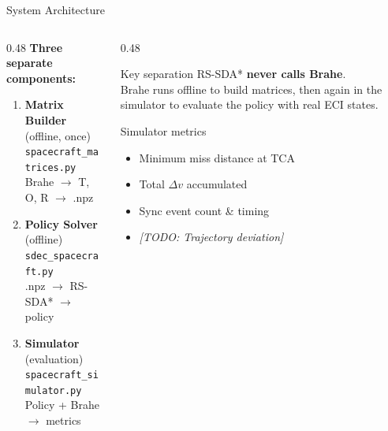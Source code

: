 \documentclass[aspectratio=169]{beamer}
\newcommand{\TODO}[1]{\textcolor{todo}{\textit{[TODO: #1]}}}
\begin{document}
\begin{frame}{System Architecture}
  \begin{columns}
    \begin{column}{0.48\textwidth}
      \textbf{Three separate components:}
      \vspace{0.5em}
      \begin{enumerate}
        \item \textbf{Matrix Builder} (offline, once)\\
              \texttt{spacecraft\_matrices.py}\\
              Brahe $\rightarrow$ T, O, R $\rightarrow$ .npz
        \vspace{0.5em}
        \item \textbf{Policy Solver} (offline)\\
              \texttt{sdec\_spacecraft.py}\\
              .npz $\rightarrow$ RS-SDA* $\rightarrow$ policy
        \vspace{0.5em}
        \item \textbf{Simulator} (evaluation)\\
              \texttt{spacecraft\_simulator.py}\\
              Policy + Brahe $\rightarrow$ metrics
      \end{enumerate}
    \end{column}
    \begin{column}{0.48\textwidth}
      \begin{block}{Key separation}
        RS-SDA* \textbf{never calls Brahe}.\\
        Brahe runs offline to build matrices, then again in the simulator to evaluate the policy with real ECI states.
      \end{block}
      \vspace{0.5em}
      \begin{alertblock}{Simulator metrics}
        \begin{itemize}
          \item Minimum miss distance at TCA
          \item Total $\Delta v$ accumulated
          \item Sync event count \& timing
          \item \TODO{Trajectory deviation}
        \end{itemize}
      \end{alertblock}
    \end{column}
  \end{columns}
\end{frame}
\end{document}
